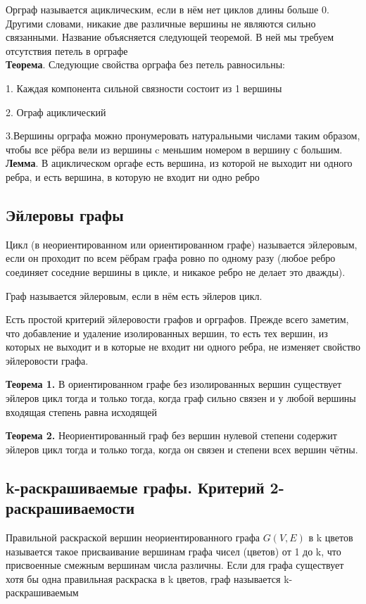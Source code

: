 \documentclass[a4paper, 10pt]{article}
\begin{document}
Орграф называется ациклическим, если в нём нет циклов длины больше 0. Другими словами, никакие две различные вершины не являются сильно связанными. Название объясняется следующей теоремой. В ней мы требуем отсутствия петель в орграфе\\

\textbf{Теорема}. Следующие свойства орграфа без петель равносильны:

1. Каждая компонента сильной связности состоит из 1 вершины

2. Ограф ациклический

3.Вершины орграфа можно пронумеровать натуральными числами таким образом, чтобы все рёбра вели из вершины c меньшим номером в вершину с большим.\\

\textbf{Лемма}. В ациклическом оргафе есть вершина, из которой не выходит ни одного ребра, и есть вершина, в которую не входит ни одно ребро


\subsection{Эйлеровы графы}
Цикл (в неориентированном или ориентированном графе) называется эйлеровым, если он проходит по всем рёбрам графа ровно по одному разу (любое ребро соединяет соседние вершины в цикле, и никакое ребро не делает это дважды).

Граф называется эйлеровым, если в нём есть эйлеров цикл.

Есть простой критерий эйлеровости графов и орграфов. Прежде всего заметим, что добавление и удаление изолированных вершин, то есть тех вершин, из которых
не выходит и в которые не входит ни одного ребра, не изменяет свойство эйлеровости графа.

\textbf{Теорема 1.} В ориентированном графе без изолированных вершин существует эйлеров цикл тогда и только тогда, когда граф сильно связен и у любой вершины входящая степень равна исходящей

\textbf{Теорема 2.} Неориентированный граф без вершин нулевой степени содержит эйлеров цикл тогда и только тогда, когда он связен и степени всех вершин чётны.


\subsection{k-раскрашиваемые графы. Критерий 2-раскрашиваемости}

Правильной раскраской вершин неориентированного графа $G(V, E)$ в k цветов называется такое присваивание вершинам графа чисел (цветов) от 1 до k, что присвоенные смежным вершинам числа различны. Если для графа существует хотя бы одна правильная раскраска в k цветов, граф называется k-раскрашиваемым
\end{document}
